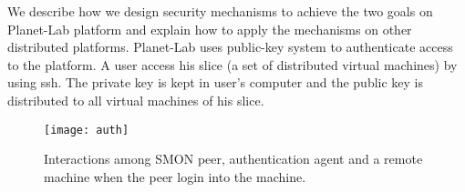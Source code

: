 
We describe how we design security mechanisms to achieve the
two goals on Planet-Lab platform and explain how to apply
the mechanisms on other distributed platforms.  Planet-Lab
uses public-key system to authenticate access to the
platform. A user access his slice (a set of distributed
virtual machines) by using ssh. The private key is kept in
user's computer and the public key is distributed to all
virtual machines of his slice.


\begin{figure}
\centering
\texttt{[image: auth]}
\caption{Interactions among SMON peer, authentication agent
and a remote machine when the peer login into the machine.}
\label{fig:auth}
\end{figure}

